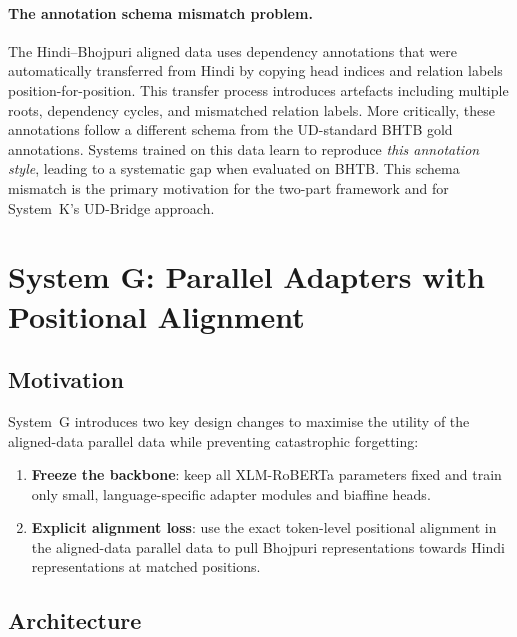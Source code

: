 \documentclass[12pt,a4paper,oneside]{report}
\newcommand{\bho}{Bhojpuri}
\newcommand{\hi}{Hindi}
\newcommand{\xlmr}{XLM-RoBERTa}
\begin{document}
\paragraph{The annotation schema mismatch problem.}
The Hindi--Bhojpuri aligned data uses dependency annotations that were automatically transferred
from Hindi by copying head indices and relation labels position-for-position. This
transfer process introduces artefacts including multiple roots, dependency cycles,
and mismatched relation labels. More critically, these annotations follow a different
schema from the UD-standard BHTB gold annotations. Systems trained on this data
learn to reproduce \emph{this annotation style}, leading to a systematic gap when
evaluated on BHTB. This schema mismatch is the primary motivation for the
two-part framework and for System~K's UD-Bridge approach.

\section{System G: Parallel Adapters with Positional Alignment}
\label{sec:system_g}

\subsection{Motivation}

System~G introduces two key design changes to maximise the utility of the aligned-data
parallel data while preventing catastrophic forgetting:
\begin{enumerate}
  \item \textbf{Freeze the backbone}: keep all \xlmr{} parameters fixed and train
        only small, language-specific adapter modules and biaffine heads.
  \item \textbf{Explicit alignment loss}: use the exact token-level positional
        alignment in the aligned-data parallel data to pull \bho{} representations
        towards \hi{} representations at matched positions.
\end{enumerate}

\subsection{Architecture}
\end{document}
